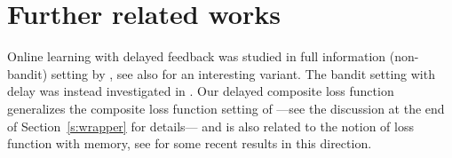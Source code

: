 \section{Further related works}
\label{s:related}
%
Online learning with delayed feedback was studied in full information (non-bandit) setting by \citet{weinberger2002delayed,mesterharm2005line,langford2009slow,joulani2013online,quanrud2015online,khashabi2016adversarial,joulani2016delay,garrabrant2016asymptotic}, see also \citep{shamir2017online} for an interesting variant. The bandit setting with delay was instead investigated in \citep{neu2010online,joulani2013online,mandel2015queue,cgmm16,pike2017bandits}. Our delayed composite loss function generalizes the composite loss function setting of \citet{ddkp14} ---see the discussion at the end of Section~\ref{s:wrapper} for details--- and is also related to the notion of loss function with memory, see \citep{ahm15} for some recent results in this direction.
